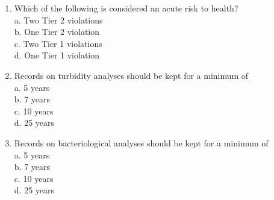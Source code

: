 \begin{enumerate}[1.]
\item Which of the following is considered an acute risk to health?\\
a. Two Tier 2 violations\\
b. One Tier 2 violation\\
c. Two Tier 1 violations\\
d. One Tier 1 violation\\
\item Records on turbidity analyses should be kept for a minimum of\\
a. 5 years\\
b. 7 years\\
c. 10 years\\
d. 25 years\\
\item Records on bacteriological analyses should be kept for a minimum of\\
a. 5 years\\
b. 7 years\\
c. 10 years\\
d. 25 years\\

\end{enumerate}
